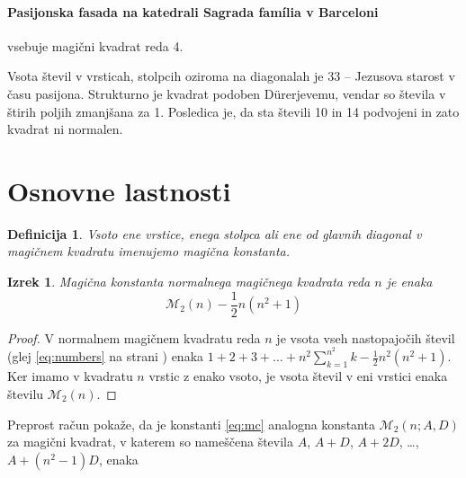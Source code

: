 \documentclass[a4paper,12pt]{article}
\newtheorem{izrek}{Izrek}
\newtheorem{definicija}{Definicija}
\newcommand{\m}{{\mathcal{M}}_2}
\begin{document}
\paragraph{Pasijonska fasada na katedrali Sagrada família v Barceloni}
vsebuje magični kvadrat reda 4.

Vsota števil v vrsticah, stolpcih oziroma na diagonalah je 33 -- Jezusova starost
v času pasijona. Strukturno je kvadrat podoben Dürerjevemu, vendar so števila
v štirih poljih zmanjšana za 1. Posledica je, da sta števili 10 in 14 podvojeni
in zato kvadrat ni normalen.


\section{Osnovne lastnosti}

\begin{definicija}
      Vsoto ene vrstice, enega stolpca ali ene od glavnih diagonal
      v magičnem kvadratu imenujemo \emph{magična konstanta}.
\end{definicija}

\begin{izrek}
	 Magična konstanta normalnega magičnega kvadrata reda \(n\)
   je enaka
   \begin{equation}
      \label{eq:mc}
      \m(n)-\frac{1}{2}n(n^2 + 1)
   \end{equation}
\end{izrek}

\begin{proof}
	V normalnem magičnem kvadratu reda \(n\) je vsota vseh nastopajočih
   števil (glej \eqref{eq:numbers} na strani \pageref{eq:numbers}) enaka \(1 + 2 + 3 +\dots + n^2 \sum_{k=1}^{n^2}k - \frac{1}{2}n^2(n^2 + 1) \). Ker imamo
   v kvadratu \(n\) vrstic z enako vsoto, je vsota števil v eni vrstici
   enaka številu \(\m(n)\). %

\end{proof}%

Preprost račun pokaže, da je konstanti \eqref{eq:mc} analogna konstanta
\(\m(n;A,D)\) za magični kvadrat, v katerem so nameščena števila
\(A\), \(A+D\), \(A+2D\), \ldots, \(A+(n^2-1)D\), enaka %
\end{document}
